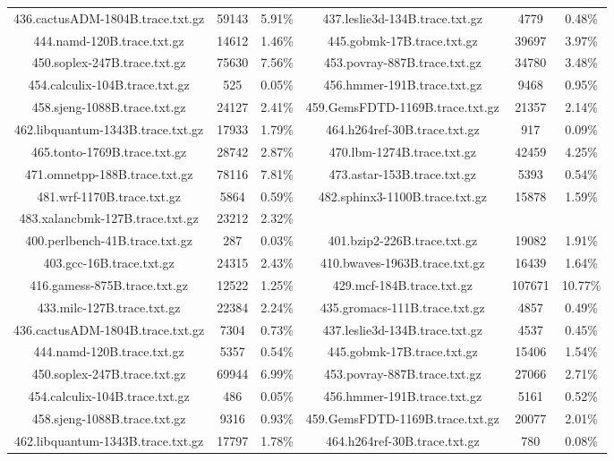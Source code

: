 \begin{table}[H]
\begin{tabular}{|c|c|c|c|c|c|}
436.cactusADM-1804B.trace.txt.gz & 59143 & 5.91\% & 437.leslie3d-134B.trace.txt.gz & 4779 & 0.48\% \\
444.namd-120B.trace.txt.gz & 14612 & 1.46\% & 445.gobmk-17B.trace.txt.gz & 39697 & 3.97\% \\
450.soplex-247B.trace.txt.gz & 75630 & 7.56\% & 453.povray-887B.trace.txt.gz & 34780 & 3.48\% \\
454.calculix-104B.trace.txt.gz & 525 & 0.05\% & 456.hmmer-191B.trace.txt.gz & 9468 & 0.95\% \\
458.sjeng-1088B.trace.txt.gz & 24127 & 2.41\% & 459.GemsFDTD-1169B.trace.txt.gz & 21357 & 2.14\% \\
462.libquantum-1343B.trace.txt.gz & 17933 & 1.79\% & 464.h264ref-30B.trace.txt.gz & 917 & 0.09\% \\
465.tonto-1769B.trace.txt.gz & 28742 & 2.87\% & 470.lbm-1274B.trace.txt.gz & 42459 & 4.25\% \\
471.omnetpp-188B.trace.txt.gz & 78116 & 7.81\% & 473.astar-153B.trace.txt.gz & 5393 & 0.54\% \\
481.wrf-1170B.trace.txt.gz & 5864 & 0.59\% & 482.sphinx3-1100B.trace.txt.gz & 15878 & 1.59\% \\
483.xalancbmk-127B.trace.txt.gz & 23212 & 2.32\% & & & &  \\
400.perlbench-41B.trace.txt.gz & 287 & 0.03\% & 401.bzip2-226B.trace.txt.gz & 19082 & 1.91\% \\
403.gcc-16B.trace.txt.gz & 24315 & 2.43\% & 410.bwaves-1963B.trace.txt.gz & 16439 & 1.64\% \\
416.gamess-875B.trace.txt.gz & 12522 & 1.25\% & 429.mcf-184B.trace.txt.gz & 107671 & 10.77\% \\
433.milc-127B.trace.txt.gz & 22384 & 2.24\% & 435.gromacs-111B.trace.txt.gz & 4857 & 0.49\% \\
436.cactusADM-1804B.trace.txt.gz & 7304 & 0.73\% & 437.leslie3d-134B.trace.txt.gz & 4537 & 0.45\% \\
444.namd-120B.trace.txt.gz & 5357 & 0.54\% & 445.gobmk-17B.trace.txt.gz & 15406 & 1.54\% \\
450.soplex-247B.trace.txt.gz & 69944 & 6.99\% & 453.povray-887B.trace.txt.gz & 27066 & 2.71\% \\
454.calculix-104B.trace.txt.gz & 486 & 0.05\% & 456.hmmer-191B.trace.txt.gz & 5161 & 0.52\% \\
458.sjeng-1088B.trace.txt.gz & 9316 & 0.93\% & 459.GemsFDTD-1169B.trace.txt.gz & 20077 & 2.01\% \\
462.libquantum-1343B.trace.txt.gz & 17797 & 1.78\% & 464.h264ref-30B.trace.txt.gz & 780 & 0.08\% \\

\end{tabular}
\end{table}
